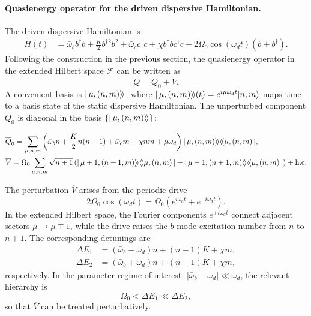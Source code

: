 \begin{appendices}
\paragraph{Quasienergy operator for the driven dispersive Hamiltonian.}
The driven dispersive Hamiltonian is
\begin{equation}
\begin{split}
\label{Driven dispersive}
    H(t) &= \bar{\omega}_b b^\dagger b + \frac{K}{2} b^{\dagger 2} b^2 + \bar{\omega}_c c^\dagger c + \chi b^\dagger b c^\dagger c + 2\Omega_0 \cos(\omega_d t) (b + b^\dagger).
\end{split}
\end{equation}
Following the construction in the previous section, the quasienergy operator in the extended Hilbert space $\mathcal{F}$ can be written as
\begin{equation}
    \overline{Q} = \overline{Q}_0 + \overline{V}.
\end{equation}
A convenient basis is $|\,\mu,(n,m)\rangle\!\rangle$, where $|\,\mu,(n,m)\rangle\!\rangle(t) = e^{i\mu\omega_dt}|n,m\rangle$ maps time to a basis state of the static dispersive Hamiltonian. The unperturbed component $\overline{Q}_0$ is diagonal in the basis $\{|\,\mu,(n,m)\rangle\!\rangle\}$:
\begin{widetext}
\begin{align}
&\overline{Q}_0 = \sum_{\mu,n,m} \left( \bar{\omega}_b n + \frac{K}{2} n(n-1) + \bar{\omega}_c m + \chi nm + \mu \omega_d \right)
|\,\mu,(n,m)\rangle\!\rangle\langle\!\langle\mu,(n,m)\,|, \\
&\overline{V} = \Omega_0 \sum_{\mu,n,m} \sqrt{n+1}
\left( |\,\mu+1,(n+1,m)\rangle\!\rangle\langle\!\langle\mu,(n,m)\,|
+ |\,\mu-1,(n+1,m)\rangle\!\rangle\langle\!\langle\mu,(n,m)\,| \right)
+ \text{h.c.}
\end{align}
\end{widetext}

The perturbation $\overline{V}$ arises from the periodic drive
\begin{equation}
    2\Omega_0 \cos(\omega_d t)=\Omega_0\!\left(e^{i\omega_d t}+e^{-i\omega_d t}\right).
\end{equation}
In the extended Hilbert space, the Fourier components $e^{\pm i\omega_d t}$ connect adjacent sectors $\mu\to\mu\mp 1$, while the drive raises the $b$-mode excitation number from $n$ to $n+1$. The corresponding detunings are
\begin{align}
    \Delta E_1 &= (\bar{\omega}_b - \omega_d)n + (n-1)K + \chi m,\\
    \Delta E_2 &= (\bar{\omega}_b + \omega_d)n + (n-1)K + \chi m,
\end{align}
respectively. In the parameter regime of interest, $|\bar{\omega}_b - \omega_d|\ll\omega_d$, the relevant hierarchy is
\begin{equation}
\label{hierarchy}
    \Omega_0 < \Delta E_1 \ll \Delta E_2,
\end{equation}
so that $\overline{V}$ can be treated perturbatively.


\end{appendices}
